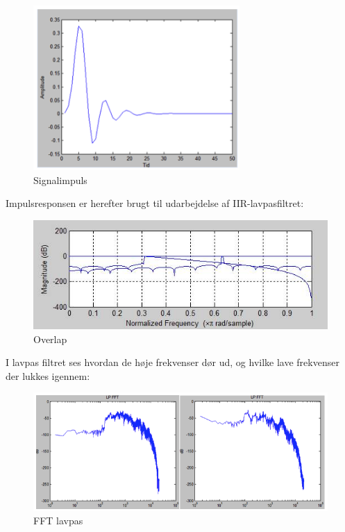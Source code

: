 \begin{figure}[H]
	\centering
	\includegraphics[width=0.7\textwidth]{Figurer/9}
	\caption{Signalimpuls}
	\label{Singalimpuls}
\end{figure}

Impulsresponsen er herefter brugt til udarbejdelse af IIR-lavpasfiltret:

\begin{figure}[H]
	\centering
	\includegraphics[width=1\textwidth]{Figurer/3}
	\caption{Overlap}
	\label{Overlap}
\end{figure}

I lavpas filtret ses hvordan de høje frekvenser dør ud, og hvilke lave frekvenser der lukkes igennem:

\begin{figure}[H]
	\centering
	\includegraphics[width=1\textwidth]{Figurer/2}
	\caption{FFT lavpas}
	\label{FFT signal}
\end{figure}

